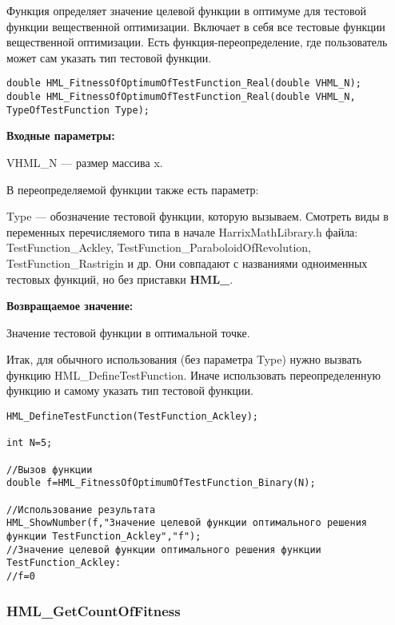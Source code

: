 \documentclass[a4paper,12pt]{article}
\begin{document}
Функция определяет значение целевой функции в оптимуме для тестовой функции вещественной оптимизации. Включает в себя все тестовые функции вещественной оптимизации. Есть функция-переопределение, где пользователь может сам указать тип тестовой функции.


\begin{lstlisting}[label=code_syntax_HML_FitnessOfOptimumOfTestFunction_Real,caption=Синтаксис]
double HML_FitnessOfOptimumOfTestFunction_Real(double VHML_N);
double HML_FitnessOfOptimumOfTestFunction_Real(double VHML_N, TypeOfTestFunction Type);
\end{lstlisting}

\textbf{Входные параметры:}

VHML\_N --- размер массива x.

В переопределяемой функции также есть параметр:
  
Type --- обозначение тестовой функции, которую вызываем.
Смотреть виды в переменных перечисляемого типа в начале HarrixMathLibrary.h файла: TestFunction\_Ackley, TestFunction\_ParaboloidOfRevolution, TestFunction\_Rastrigin и др. Они совпадают с названиями одноименных тестовых функций, но без приставки \textbf{HML\_}.

\textbf{Возвращаемое значение:}
 
Значение тестовой функции в оптимальной точке.

Итак, для обычного использования (без параметра Type) нужно вызвать функцию HML\_DefineTestFunction. Иначе использовать переопределенную функцию и самому указать тип тестовой функции.


\begin{lstlisting}[label=code_use_HML_FitnessOfOptimumOfTestFunction_Real,caption=Пример использования]
HML_DefineTestFunction(TestFunction_Ackley);

int N=5;

//Вызов функции
double f=HML_FitnessOfOptimumOfTestFunction_Binary(N);

//Использование результата
HML_ShowNumber(f,"Значение целевой функции оптимального решения функции TestFunction_Ackley","f");
//Значение целевой функции оптимального решения функции TestFunction_Ackley:
//f=0
\end{lstlisting}

\subsubsection{HML\_GetCountOfFitness}\label{HML_GetCountOfFitness}
\end{document}

